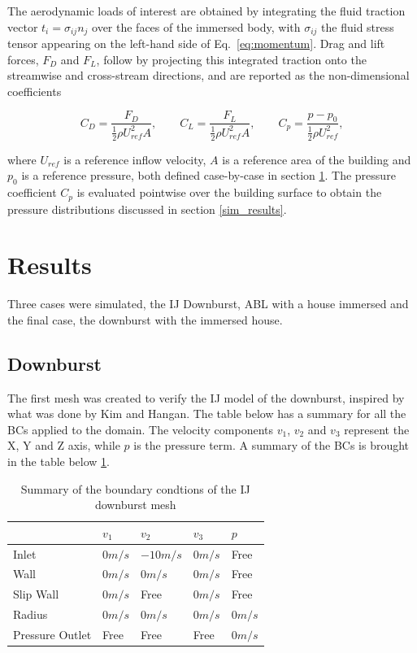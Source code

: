 \documentclass{article}
\begin{document}
The aerodynamic loads of interest are obtained by integrating the fluid traction vector $t_i = \sigma_{ij}n_j$ over the faces of the immersed body, with $\sigma_{ij}$ the fluid stress tensor appearing on the left-hand side of Eq.~\eqref{eq:momentum}. Drag and lift forces, $F_D$ and $F_L$, follow by projecting this integrated traction onto the streamwise and cross-stream directions, and are reported as the non-dimensional coefficients

\begin{equation}
C_D = \frac{F_D}{\frac{1}{2}\rho U_{ref}^2 A}, \qquad C_L = \frac{F_L}{\frac{1}{2}\rho U_{ref}^2 A}, \qquad C_p = \frac{p-p_0}{\frac{1}{2}\rho U_{ref}^2},
\label{eq:coeffs}
\end{equation}

where $U_{ref}$ is a reference inflow velocity, $A$ is a reference area of the building and $p_0$ is a reference pressure, both defined case-by-case in section \ref{results}. The pressure coefficient $C_p$ is evaluated pointwise over the building surface to obtain the pressure distributions discussed in section \ref{sim_results}.

\section{Results} \label{results}

Three cases were simulated, the IJ Downburst, ABL with a house immersed and the final case, the downburst with the immersed house.


\subsection{Downburst} \label{downburst}
The first mesh was created to verify the IJ model of the downburst, inspired by
what was done by Kim and Hangan\cite{kim}. The table below has a summary for all the BCs applied to the domain. The velocity components $v_1$, $v_2$ and $v_3$ represent the X, Y and Z axis, while $p$ is the pressure term. A summary of the BCs is brought in the table below \ref{dbBC}.

  
\begin{table}[] \label{dbBC}
\centering
\begin{tabular}{|l|l|l|l|l|}
\hline
	        & $v_1$   & $v_2$     & $v_3$   & $p$    \\
\hline
Inlet           & $0 m/s$ & $-10 m/s$ & $0 m/s$ & Free \\
\hline
Wall           	& $0 m/s$ & $0 m/s$   & $0 m/s$ & Free \\
\hline
Slip Wall       & $0 m/s$ & Free      & $0 m/s$ & Free \\
\hline
Radius          & $0 m/s$ & $0 m/s$   & $0 m/s$ & $0 m/s$ \\
\hline
Pressure Outlet & Free 	  & Free      & Free &  $ 0 m/s$ \\
\hline
\end{tabular}
\caption{Summary of the boundary condtions of the IJ downburst mesh}
\end{table}
\end{document}
